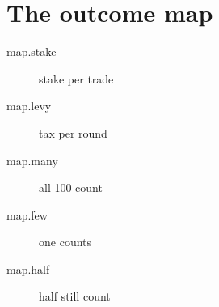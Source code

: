 \section{The outcome map}

\begin{description}
  \item[map.stake] stake per trade
  \item[map.levy] tax per round
  \item[map.many] all 100 count
  \item[map.few] one counts
  \item[map.half] half still count
\end{description}
